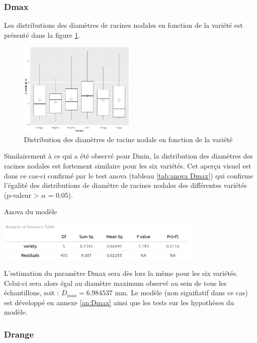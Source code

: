 \subsubsection{Dmax}

Les distributions des diamètres de racines nodales en fonction de la variété est présenté dans la figure \ref{fig:boxplot Dmax}.

\begin{figure}[ht]
\centering
\includegraphics[width=0.5\textwidth]{Image/boxplot Dmax.png}
\caption{Distribution des diamètres de racine nodale en fonction de la variété}
\label{fig:boxplot Dmax}
\end{figure}
\newpage

Similairement à ce qui a été observé pour Dmin, la distribution des diamètres des racines nodales est fortement similaire pour les six variétés.
Cet aperçu visuel est dans ce cas-ci confirmé par le test anova (tableau \ref{tab:anova Dmax}) qui confirme l'égalité des distributions de diamètre de racines nodales des différentes variétés (p-valeur > $\alpha$ = 0.05).

\begin{table}[!ht]
    \centering
    \caption{Anova du modèle}
    \includegraphics[width=0.75\textwidth]{Image/anova Dmax.png}
    \label{tab:anova Dmax}
\end{table}

L'estimation du paramètre Dmax sera dès lors la même pour les six variétés.
Celui-ci sera alors égal au diamètre maximum observé au sein de tous les échantillons, soit : $D_{max} = 6.984537$ mm.
Le modèle (non signifiatif dans ce cas) est développé en annexe \ref{an:Dmax} ainsi que les tests sur les hypothèses du modèle.

\subsubsection{Drange}

